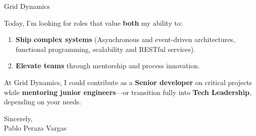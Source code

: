 \documentclass[10.5pt]{letter}
\newcommand{\companyName}{Grid Dynamics}
\begin{document}
\begin{letter}{
    \companyName
}
\par
Today, I’m looking for roles that value \textbf{both} my ability to:
\begin{enumerate}
    \item \textbf{Ship complex systems} (Asynchronous and event-driven architectures, functional programming, scalability and RESTful services).
    \item \textbf{Elevate teams} through mentorship and process innovation.
\end{enumerate}
At \companyName{}, I could contribute as a \textbf{Senior developer} on critical projects while \textbf{mentoring junior engineers}—or transition fully into \textbf{Tech Leadership}, depending on your needs.

\closing{Sincerely, \\ Pablo Peraza Vargas}


\end{letter}
\end{document}
